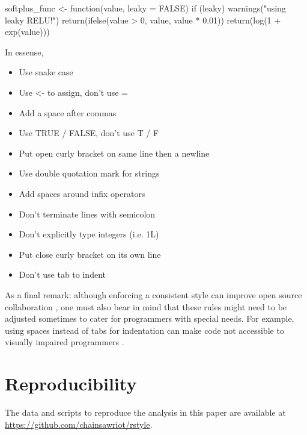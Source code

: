\begin{example}
softplus_func <- function(value, leaky = FALSE) {
    if (leaky) {
        warnings("using leaky RELU!")
        return(ifelse(value > 0, value, value * 0.01))
    }
    return(log(1 + exp(value)))
}
\end{example}

In essense,

\begin{itemize}
  \item Use snake case
  \item Use <- to assign, don't use =
  \item Add a space after commas
  \item Use TRUE / FALSE, don't use T / F
  \item Put open curly bracket on same line then a newline
  \item Use double quotation mark for strings
  \item Add spaces around infix operators
  \item Don't terminate lines with semicolon
  \item Don’t explicitly type integers (i.e. 1L)
  \item Put close curly bracket on its own line
  \item Don't use tab to indent
\end{itemize}

As a final remark: although enforcing a consistent style can improve open source collaboration \citep{wang}, one must also bear in mind that these rules might need to be adjusted sometimes to cater for programmers with special needs. For example, using spaces instead of tabs for indentation can make code not accessible to visually impaired programmers \citep{mosal}.

\section{Reproducibility}

The data and scripts to reproduce the analysis in this paper are available at \url{https://github.com/chainsawriot/rstyle}.



\newpage
\address{Chia-Yi Yen\\
  Mannheim Business School, Universit\"at Mannheim\\
  L 5, 6, 68131 Mannheim\\
  Germany\\
  \url{https://orcid.org/0000-0003-1209-7789}\\
  }

